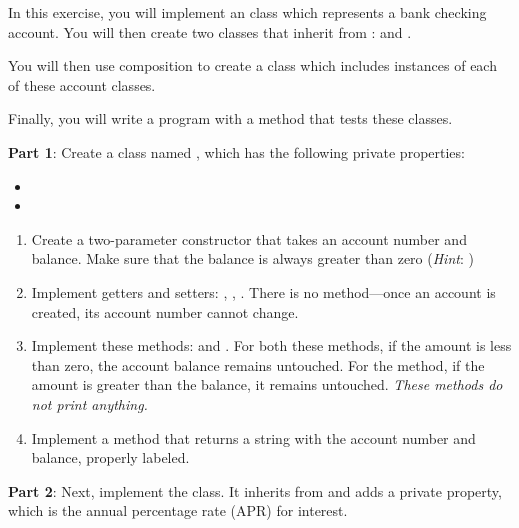 
\begin{exercise}

In this exercise, you will implement an  class which represents a bank checking account. You will then create two classes that inherit from :  and .

You will then use composition to create a  class which includes instances of each of these account classes.

Finally, you will write a program with a  method that tests these classes.

{\bf Part 1}: Create a class named , which has the following private properties:

\begin{itemize}
    \item {}
    \item {}
\end{itemize}

\begin{enumerate}
\item Create a two-parameter constructor that takes an account number and balance. Make sure that the balance is always greater than zero ({\em Hint}: )

\item Implement getters and setters: , , . There is no  method---once an account is created, its account number cannot change.

\item Implement these methods:  and . For both these methods, if the amount is less than zero, the account balance remains untouched. For the  method, if the amount is greater than the balance, it remains untouched. {\em These methods do not print anything.}

\item Implement a  method that returns a string with the account number and balance, properly labeled.
\end{enumerate}

{\bf Part 2}: Next, implement the  class. It inherits from  and adds a private  property, which is the annual percentage rate (APR) for interest.


\end{exercise}
